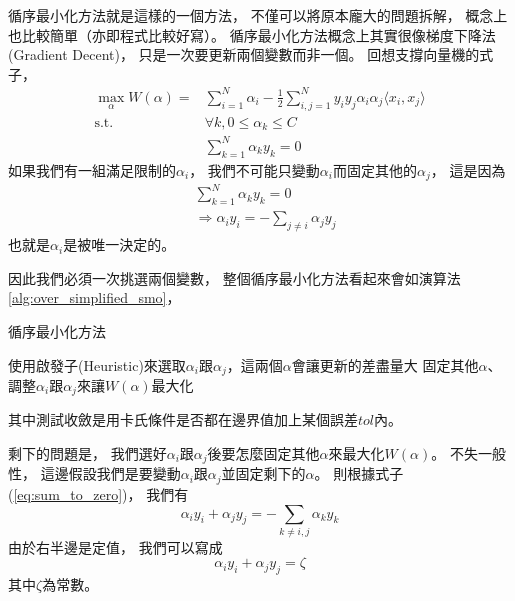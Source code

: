   循序最小化方法就是這樣的一個方法，
  不僅可以將原本龐大的問題拆解，
  概念上也比較簡單（亦即程式比較好寫）。
  循序最小化方法概念上其實很像梯度下降法(Gradient Decent)，
  只是一次要更新兩個變數而非一個。
  回想支撐向量機的式子，
  \begin{equation}
    \begin{split}
      \max_{\alpha} W(\alpha) = &\sum_{i=1}^N \alpha_i - \frac{1}{2} \sum_{i,j=1}^N y_i y_j \alpha_i \alpha_j \langle x_i, x_j \rangle \\
      \text{s.t. } &\forall k, 0 \leq \alpha_k \leq C \\
      &\sum_{k=1}^N \alpha_k y_k = 0
    \end{split}
  \end{equation}
  如果我們有一組滿足限制的$\alpha_i$，
  我們不可能只變動$\alpha_i$而固定其他的$\alpha_j$，
  這是因為
  \begin{equation}
    \begin{split}
      & \sum_{k=1}^N \alpha_k y_k = 0 \label{eq:sum_to_zero} \\
      & \Rightarrow \alpha_i y_i = - \sum_{j \neq i} \alpha_j y_j
    \end{split}
  \end{equation}
  也就是$\alpha_i$是被唯一決定的。

  因此我們必須一次挑選兩個變數，
  整個循序最小化方法看起來會如演算法\ref{alg:over_simplified_smo}，
  \begin{algorithm}
    \caption{循序最小化方法}
    \label{alg:over_simplified_smo}
    \begin{algorithmic}[1]
      \REPEAT
	\STATE 使用啟發子(Heuristic)來選取$\alpha_i$跟$\alpha_j$，這兩個$\alpha$會讓更新的差盡量大
	\STATE 固定其他$\alpha$、調整$\alpha_i$跟$\alpha_j$來讓$W(\alpha)$最大化
    \end{algorithmic}
  \end{algorithm}
  其中測試收斂是用卡氏條件是否都在邊界值加上某個誤差$tol$內。

  剩下的問題是，
  我們選好$\alpha_i$跟$\alpha_j$後要怎麼固定其他$\alpha$來最大化$W(\alpha)$。
  不失一般性，
  這邊假設我們是要變動$\alpha_i$跟$\alpha_j$並固定剩下的$\alpha$。
  則根據式子(\ref{eq:sum_to_zero})，
  我們有
  \begin{equation}
    \alpha_i y_i + \alpha_j y_j = - \sum_{k \neq i, j} \alpha_k y_k
  \end{equation}
  由於右半邊是定值，
  我們可以寫成
  \begin{equation}
    \alpha_i y_i + \alpha_j y_j = \zeta
  \end{equation}
  其中$\zeta$為常數。

